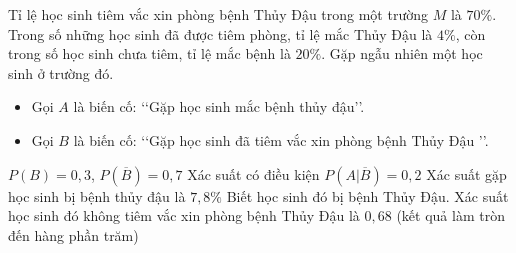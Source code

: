 \begin{ex}%
	Tỉ lệ học sinh tiêm vắc xin phòng bệnh Thủy Đậu trong một trường $M$ là $70\%$. Trong số những học sinh đã được tiêm phòng, tỉ lệ mắc Thủy Đậu là $4\%$, còn trong số học sinh chưa tiêm, tỉ lệ mắc bệnh là $20\%$. Gặp ngẫu nhiên một học sinh ở trường đó.
	\begin{itemize}
		\item Gọi $A$ là biến cố: \lq\lq Gặp học sinh mắc bệnh thủy đậu\rq\rq.
		\item Gọi $B$ là biến cố: \lq\lq Gặp học sinh đã tiêm vắc xin phòng bệnh Thủy Đậu \rq\rq.
	\end{itemize}
	\choiceTF
	{$P(B) = 0{,}3$, $P\left( \overline{B}\right) = 0{,}7$}
	{\True Xác suất có điều kiện $P \left(A | \overline{B} \right) = 0{,}2$}
	{Xác suất gặp học sinh bị bệnh thủy đậu là $7{,}8\%$}
	{\True Biết học sinh đó bị bệnh Thủy Đậu. Xác suất học sinh đó không tiêm vắc xin phòng bệnh Thủy Đậu là $0{,}68$ (kết quả làm tròn đến hàng phần trăm)}
\end{ex}

